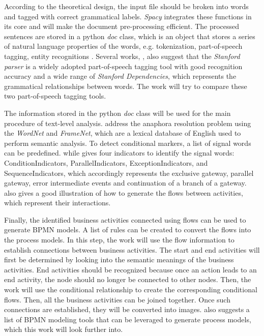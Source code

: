 According to the theoretical design, the input file should be broken into words and tagged with correct grammatical labels. \textit{Spacy} integrates these functions in its core and will make the document pre-processing efficient. The processed sentences are stored in a python \textit{doc} class, which is an object that stores a series of natural language properties of the words, e.g. tokenization, part-of-speech tagging, entity recognitions \cite{complement_1}. Several works, \cite{t2m_1} \cite{t2m_2} \cite{t2m_4}, also suggest that the \textit{Stanford parser} is a widely adopted part-of-speech tagging tool with good recognition accuracy and a wide range of \textit{Stanford Dependencies}, which represents the grammatical relationships between words. The work will try to compare these two part-of-speech tagging tools. 

The information stored in the python \textit{doc} class will be used for the main procedure of text-level analysis. \cite{literature_review_4} \cite{t2m_1} address the anaphora resolution problem using the \textit{WordNet} and \textit{FrameNet}, which are a lexical database of English used to perform semantic analysis. To detect conditional markers, a list of signal words can be predefined. while \cite{t2m_1} gives four indicators to identify the signal words: ConditionIndicators, ParallelIndicators, ExceptionIndicators, and SequenceIndicators, which accordingly represents the exclusive gateway, parallel gateway, error intermediate events and continuation of a branch of a gateway. \cite{t2m_1} also gives a good illustration of how to generate the flows between activities, which represent their interactions. 


Finally, the identified business activities connected using flows can be used to generate BPMN models. A list of rules can be created to convert the flows into the process models. In this step, the work will use the flow information to establish connections between business activities. The start and end activities will first be determined by looking into the semantic meanings of the business activities. End activities should be recognized because once an action leads to an end activity, the node should no longer be connected to other nodes. Then, the work will use the conditional relationship to create the corresponding conditional flows. Then, all the business activities can be joined together. Once such connections are established, they will be converted into images.\cite{literature_review_1} also suggests a list of BPMN modeling tools that can be leveraged to generate process models, which this work will look further into. 

